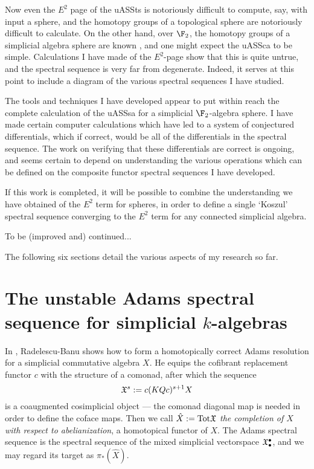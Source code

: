 \documentclass[11pt]{article}
\begin{document}
Now even the $E^2$ page of the uASSts is notoriously difficult to compute, say, with input a sphere, and the homotopy groups of a topological sphere are notoriously difficult to calculate. On the other hand, over $\F_2$, the homotopy groups of a simplicial algebra sphere are known \cite{DwyerHtpyOpsSimpComAlg.pdf}, and one might expect the uASSca to be simple. Calculations I have made of the $E^2$-page show that this is quite untrue, and the spectral sequence is very far from degenerate. Indeed, it serves at this point to include a diagram of the various spectral sequences I have studied.

The tools and techniques I have developed appear to put within reach the complete calculation of the uASSsa for a simplicial $\F_2$-algebra sphere. I have made certain computer calculations which have led to a system of conjectured differentials, which if correct, would be all of the differentials in the spectral sequence. The work on verifying that these differentials are correct is ongoing, and seems certain to depend on understanding the various operations which can be defined on the composite functor spectral sequences I have developed.

If this work is completed, it will be possible to combine the understanding we have obtained of the $E^2$ term for spheres, in order to define a single `Koszul' spectral sequence converging to the $E^2$ term for any connected simplicial algebra.

To be (improved and) continued...

\textup{}

\noindent The following six sections detail the various aspects of my research so far.



\section{The unstable Adams spectral sequence for simplicial $k$-algebras}
In \cite{radelescuBanu.pdf}, Radelescu-Banu shows how to form a homotopically correct Adams resolution for a simplicial commutative algebra $X$. He equips the cofibrant replacement functor $c$ with the structure of a comonad, after which the sequence
\[\mathfrak{X}^s:=c(KQc)^{s+1}X\]
is a coaugmented cosimplicial object --- the comonad diagonal map is needed in order to define the coface maps. Then we call $\hat X:=\textup{Tot}\mathfrak{X}$ \emph{the completion of $X$ with respect to abelianization}, a homotopical functor of $X$. The Adams spectral sequence is the spectral sequence of the mixed simplicial vectorspace $\mathfrak{X}^\bullet_\bullet$, and we may regard its target as $\pi_*(\hat X)$.
\end{document}
